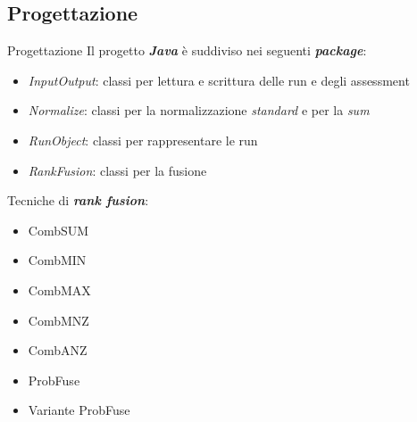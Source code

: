 \subsection{Progettazione}
\begin{frame}{Progettazione}
	Il progetto \textbf{\textit{Java}} è suddiviso nei seguenti \textbf{\textit{package}}:
	\begin{itemize}
		\item \textit{InputOutput}: classi per lettura e scrittura delle run e degli assessment 
		\item \textit{Normalize}: classi per la normalizzazione \textit{standard} e per la \textit{sum}
		\item \textit{RunObject}: classi per rappresentare le run
		\item \textit{RankFusion}: classi per la fusione
	\end{itemize}

	\vspace{1em}

	Tecniche di \textbf{\textit{rank fusion}}:
	\begin{multicols}{2}
		\begin{itemize}
			\item CombSUM
			\item CombMIN
			\item CombMAX
			\item CombMNZ
			\item CombANZ
			\item ProbFuse
			\item Variante ProbFuse
		\end{itemize}
	\end{multicols}
\end{frame}


